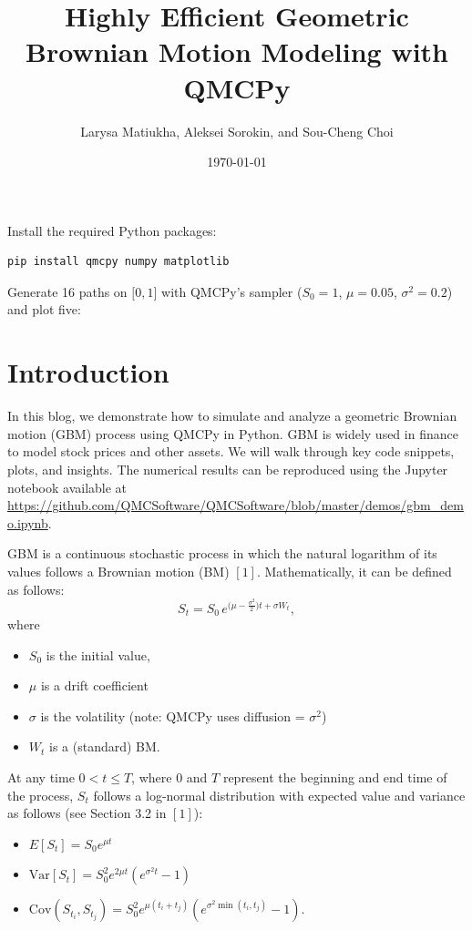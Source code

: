\documentclass{article}
\title{Highly Efficient Geometric Brownian Motion Modeling with QMCPy}
\author{Larysa Matiukha, Aleksei Sorokin, and Sou-Cheng Choi}
\date{\today}
\begin{document}
\maketitle

\begin{tcolorbox}[title=Quick Start,colback=blue!1,colframe=blue!30!black,breakable]
Install the required Python packages:
%
\begin{lstlisting}[language=bash,basicstyle=\ttfamily,frame=none,numbers=none]
    pip install qmcpy numpy matplotlib
\end{lstlisting}

Generate 16 paths on $\lbrack 0,1\rbrack$ with QMCPy's sampler  ($S_0=1$, $\mu=0.05$, $\sigma^2=0.2$) and plot five:
%

\end{tcolorbox}


\section{Introduction}

In this blog, we demonstrate how to simulate and analyze a geometric Brownian motion (GBM) process using QMCPy in Python.
GBM is widely used in finance to model stock prices and other assets. 
We will walk through key code snippets, plots, and insights. The numerical results can be reproduced using the Jupyter notebook available at \href{gbm\_demo.ipynb}{\url{https://github.com/QMCSoftware/QMCSoftware/blob/master/demos/gbm\_demo.ipynb}}.

GBM is a continuous stochastic process in which the natural logarithm of its values follows a Brownian motion (BM) $[1]$.
Mathematically, it can be defined as follows:
\begin{equation}
S_t = S_0 \, e^{\bigl(\mu - \tfrac{\sigma^2}{2}\bigr)  t + \sigma W_t}, \label{gbm}
\end{equation}
where
\begin{itemize}
\item $S_0$ is the initial value, 
\item $\mu$ is a drift coefficient
\item $\sigma$ is the volatility (note: QMCPy uses diffusion = $\sigma^2$)
\item $W_t$ is a (standard) BM.
\end{itemize}

At any time $0 < t \le T$, where $0$ and $T$ represent the beginning and end time of the process, $S_t$ follows a log-normal distribution with expected value and variance as follows (see Section 3.2 in $[1]$):
\begin{itemize}
\item
 $E[S_t] = S_0 e^{\mu t}$
\item $\text{Var}[S_t] = S_0^2 e^{2\mu t}(e^{\sigma^2 t} - 1)$
\item   $  
    \text{Cov}(S_{t_i}, S_{t_j}) = S_0^2 e^{\mu(t_i + t_j)} \left(e^{\sigma^2 \min(t_i, t_j)} - 1\right).$
\end{itemize}
\end{document}
